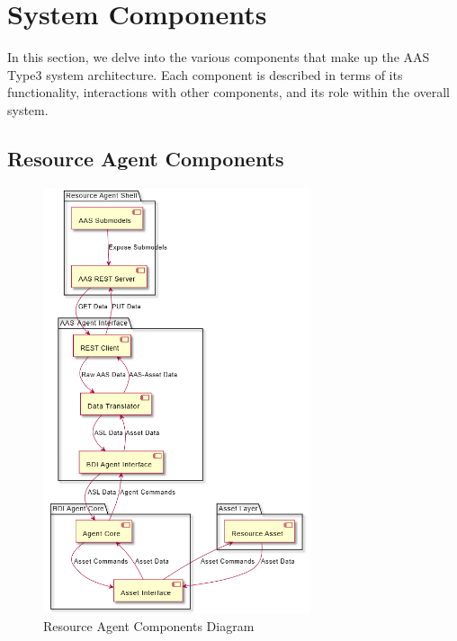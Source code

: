 \section{System Components}
In this section, we delve into the various components that make up the AAS Type3 system architecture. Each component is described in terms of its functionality, interactions with other components, and its role within the overall system.

\subsection{Resource Agent Components}

\begin{figure}[ht]
    \centering
    \includegraphics[width=0.7\textwidth]{Images/Resource_agent_components.png}
    \caption{Resource Agent Components Diagram}
    \label{fig:resource_agent_components}
\end{figure}

